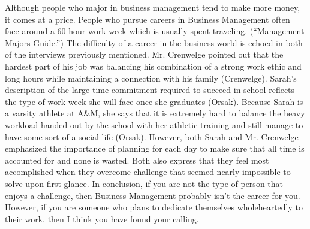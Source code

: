     Although people who major in business management tend to make more money, it comes at a price. People who pursue careers in Business Management often face around a 60-hour work week which is usually spent traveling. (“Management Majors Guide.”) The difficulty of a career in the business world is echoed in both of the interviews previously mentioned. Mr. Crenwelge pointed out that the hardest part of his job was balancing his combination of a strong work ethic and long hours while maintaining a connection with his family (Crenwelge). Sarah’s description of the large time commitment required to succeed in school reflects the type of work week she will face once she graduates (Orsak). Because Sarah is a varsity athlete at A\&M, she says that it is extremely hard to balance the heavy workload handed out by the school with her athletic training and still manage to have some sort of a social life (Orsak). However, both Sarah and Mr. Crenwelge emphasized the importance of planning for each day to make sure that all time is accounted for and none is wasted. Both also express that they feel most accomplished when they overcome challenge that seemed nearly impossible to solve upon first glance. In conclusion, if you are not the type of person that enjoys a challenge, then Business Management probably isn’t the career for you. However, if you are someone who plans to dedicate themselves wholeheartedly to their work, then I think you have found your calling. 